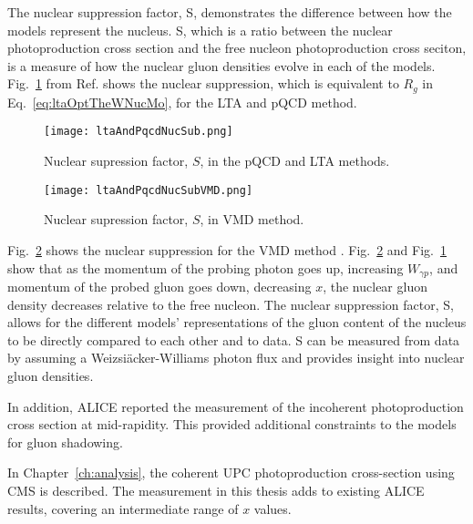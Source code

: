   The nuclear suppression factor, S, demonstrates the difference between how 
    the models represent the nucleus. 
  S, which is a ratio between the nuclear photoproduction cross section and the     
    free nucleon photoproduction cross seciton, is a measure of how the nuclear 
    gluon densities evolve in each of the models. 
  Fig.~\ref{fig:ltaAndPqcdNucSub} from Ref.\cite{lta2013.05} shows the nuclear 
    suppression, which is equivalent to $R_g$ in Eq.~\ref{eq:ltaOptTheWNucMo}, 
    for the LTA and pQCD method.
  \begin{figure}[h] 
    \begin{center}
      \texttt{[image: ltaAndPqcdNucSub.png]}
    \end{center}
    \caption{ \label{fig:ltaAndPqcdNucSub} Nuclear supression factor, $S$, in the pQCD and LTA methods.}
  \end{figure}
  \begin{figure}
    \begin{center}
      \texttt{[image: ltaAndPqcdNucSubVMD.png]}
    \end{center}
    \caption{ \label{fig:ltaAndPqcdNucSubVMD} Nuclear supression factor, $S$, in VMD method.}
  \end{figure}
  Fig.~\ref{fig:ltaAndPqcdNucSubVMD} shows the nuclear suppression for the VMD 
    method \cite{lta2013.05}. 
  Fig.~\ref{fig:ltaAndPqcdNucSubVMD} and Fig.~\ref{fig:ltaAndPqcdNucSub} show that 
    as the momentum of the probing photon goes up, increasing $W_{\gamma p}$, 
    and momentum of the probed gluon goes down, decreasing $x$, 
    the nuclear gluon density decreases relative to the free nucleon. 
  The nuclear suppression factor, S, allows for the different models' 
    representations of the gluon content of the nucleus to be directly compared
    to each other and to data. 
  S can be measured from data by assuming a Weizsi\"{a}cker-Williams photon flux and 
    provides insight into nuclear gluon densities.

    In addition, ALICE reported the measurement of the incoherent \JPsi{} 
      photoproduction cross section at mid-rapidity.
    This provided additional constraints to the models for gluon shadowing. 

    In Chapter~\ref{ch:analysis}, the coherent UPC \JPsi{} photoproduction 
      cross-section using CMS is described.
    The measurement in this thesis adds to existing ALICE results, covering
      an intermediate range of $x$ values. 
